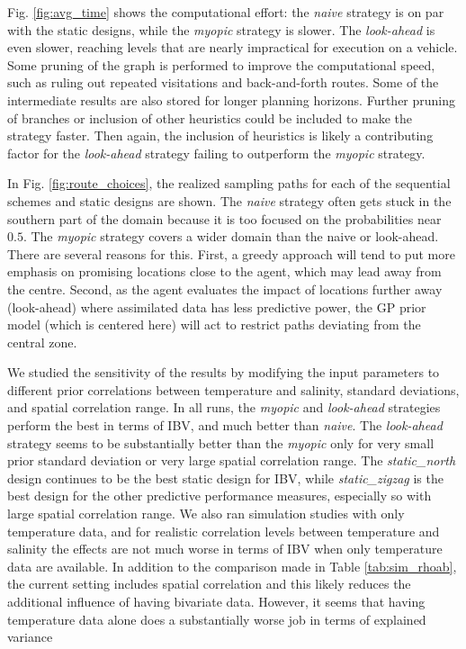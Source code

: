 \documentclass[aoas]{imsart}
\begin{document}
Fig. \ref{fig:avg_time} shows the computational effort: the
\textit{naive} strategy is on par with the static designs, while the
\textit{myopic} strategy is slower. The \textit{look-ahead} is even
slower, reaching levels that are nearly impractical for execution on a
vehicle. Some pruning of the graph is performed to improve the
computational speed, such as ruling out repeated visitations and
back-and-forth routes. Some of the intermediate results are also
stored for longer planning horizons. Further pruning of branches or
inclusion of other heuristics could be included to make the strategy
faster. Then again, the inclusion of heuristics is likely a
contributing factor for the \textit{look-ahead} strategy failing to
outperform the \textit{myopic} strategy.

In Fig. \ref{fig:route_choices}, the realized sampling paths for each
of the sequential schemes and static designs are shown. The
\textit{naive} strategy often gets stuck in the southern part of the
domain because it is too focused on the probabilities near $0.5$. The
\textit{myopic} strategy covers a wider domain than the naive or
look-ahead. There are several reasons for this. First, a greedy
approach will tend to put more emphasis on promising locations close to the
agent, which may lead away from the centre. Second, as the agent
evaluates the impact of locations further away (look-ahead) where
assimilated data has less predictive power, the GP prior model (which
is centered here) will act to restrict paths deviating from the
central zone.

We studied the sensitivity of the results by modifying the input parameters to different prior correlations between temperature and salinity, standard deviations, and spatial correlation range.  In all runs,  the \textit{myopic} and \textit{look-ahead} strategies perform the best in terms of IBV, and much better than \textit{naive}. The \textit{look-ahead} strategy seems to be substantially better than the \textit{myopic} only for very small prior standard deviation or very large spatial correlation range. The \textit{static\_north} design continues to be the best static design for IBV, while \textit{static\_zigzag} is the best design for the other predictive performance measures, especially so with large spatial correlation range. We also ran simulation studies with only temperature data, and for realistic correlation levels between temperature and salinity the effects are not much worse in terms of IBV when only temperature data are available. In addition to the comparison made in Table \ref{tab:sim_rhoab}, the current setting includes spatial correlation and this likely reduces the additional influence of having bivariate data. However, it seems that having temperature data alone does a substantially worse job in terms of explained variance
\end{document}
